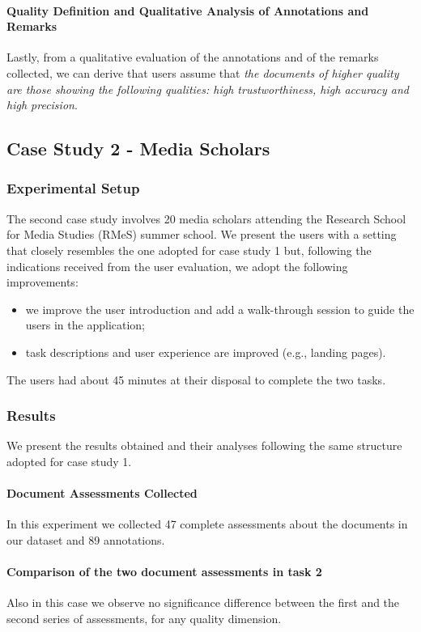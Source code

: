 \documentclass{llncs}
\begin{document}
\paragraph{Quality Definition and Qualitative Analysis of Annotations and Remarks}
Lastly, from a qualitative evaluation of the annotations and of the remarks collected, we can derive that users assume that \emph{the documents of higher quality are those showing the following qualities: high trustworthiness, high accuracy and high precision}.

\subsection{Case Study 2 - Media Scholars}
\subsubsection{Experimental Setup}
The second case study involves 20 media scholars attending the Research School for Media Studies (RMeS) summer school.
We present the users with a setting that closely resembles the one adopted for case study 1 but, following the indications received from the user evaluation, we adopt the following improvements:
\begin{itemize}
\item we improve the user introduction and add a walk-through session to guide the users in the application;
\item task descriptions and user experience are improved (e.g., landing pages).
\end{itemize}
The users had about 45 minutes at their disposal to complete the two tasks.

\subsubsection{Results} We present the results obtained and their analyses following the same structure adopted for case study 1.
\paragraph{Document Assessments Collected} In this experiment we collected 47 complete assessments about the documents in our dataset and 89 annotations.
\paragraph{Comparison of the two document assessments in task 2} Also in this case we observe no significance difference between the first and the second series of assessments, for any quality dimension.
\end{document}

